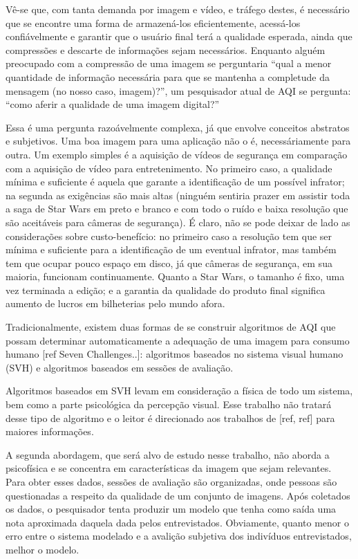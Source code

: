 	Vê-se que, com tanta demanda por imagem e vídeo, e tráfego destes, é necessário que se encontre uma forma de armazená-los eficientemente, acessá-los confiávelmente e garantir que o usuário final terá a qualidade esperada, ainda que compressões e descarte de informações sejam necessários. Enquanto alguém preocupado com a compressão de uma imagem se perguntaria ``qual a menor quantidade de informação necessária para que se mantenha a completude da mensagem (no nosso caso, imagem)?'', um pesquisador atual de AQI se pergunta: ``como aferir a qualidade de uma imagem digital?''

	Essa é uma pergunta razoávelmente complexa, já que envolve conceitos abstratos e subjetivos. Uma boa imagem para uma aplicação não o é, necessáriamente para outra. Um exemplo simples é a aquisição de vídeos de segurança em comparação com a aquisição de vídeo para entretenimento. No primeiro caso, a qualidade mínima e suficiente é aquela que garante a identificação de um possível infrator; na segunda as exigências são mais altas (ninguém sentiria prazer em assistir toda a saga de Star Wars em preto e branco e com todo o ruído e baixa resolução que são aceitáveis para câmeras de segurança). É claro, não se pode deixar de lado as considerações sobre custo-benefício: no primeiro caso a resolução tem que ser mínima e suficiente para a identificação de um eventual infrator, mas também tem que ocupar pouco espaço em disco, já que câmeras de segurança, em sua maioria, funcionam continuamente. Quanto a Star Wars, o tamanho é fixo, uma vez terminada a edição; e a garantia da qualidade do produto final significa aumento de lucros em bilheterias pelo mundo afora.

	Tradicionalmente, existem duas formas de se construir algoritmos de AQI que possam determinar automaticamente a adequação de uma imagem para consumo humano [ref Seven Challenges..]: algoritmos baseados no sistema visual humano (SVH) e algoritmos baseados em sessões de avaliação.

	Algoritmos baseados em SVH levam em consideração a física de todo um sistema, bem como a parte psicológica da percepção visual. Esse trabalho não tratará desse tipo de algoritmo e o leitor é direcionado aos trabalhos de [ref, ref] para maiores informações. 
	
	A segunda abordagem, que será alvo de estudo nesse trabalho, não aborda a psicofísica e se concentra em características da imagem que sejam relevantes. Para obter esses dados, sessões de avaliação são organizadas, onde pessoas são questionadas a respeito da qualidade de um conjunto de imagens. Após coletados os dados, o pesquisador tenta produzir um modelo que tenha como saída uma nota aproximada daquela dada pelos entrevistados. Obviamente, quanto menor o erro entre o sistema modelado e a avalição subjetiva dos indivíduos entrevistados, melhor o modelo.

